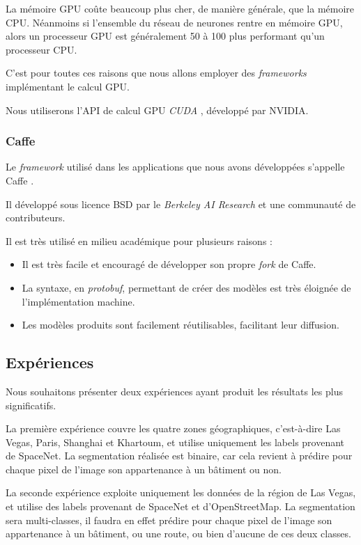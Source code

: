 \documentclass[a4paper, 11pt]{report}
\begin{document}
La mémoire GPU coûte beaucoup plus cher, de manière générale, que la mémoire CPU. Néanmoins si l'ensemble du réseau de neurones rentre en mémoire GPU, alors un processeur GPU est généralement 50 à 100 plus performant qu'un processeur CPU.

C'est pour toutes ces raisons que nous allons employer des \emph{frameworks} implémentant le calcul GPU.

Nous utiliserons l'API de calcul GPU \emph{CUDA} \citep{NVIDIACorporation2010}, développé par NVIDIA.

\subsubsection{Caffe}
Le \emph{framework} utilisé dans les applications que nous avons développées s'appelle Caffe \citep{Jia2014}.

Il développé sous licence BSD par le \emph{Berkeley AI Research} et une communauté de contributeurs.

Il est très utilisé en milieu académique pour plusieurs raisons :
\begin{itemize}
	\item Il est très facile et encouragé de développer son propre \emph{fork} de Caffe.
	\item La syntaxe, en \emph{protobuf}, permettant de créer des modèles est très éloignée de l'implémentation machine.
	\item Les modèles produits sont facilement réutilisables, facilitant leur diffusion.
\end{itemize}
\subsection{Expériences}
Nous souhaitons présenter deux expériences ayant produit les résultats les plus significatifs.

La première expérience couvre les quatre zones géographiques, c'est-à-dire Las Vegas, Paris, Shanghai et Khartoum, et utilise uniquement les labels provenant de SpaceNet.
La segmentation réalisée est binaire, car cela revient à prédire pour chaque pixel de l'image son appartenance à un bâtiment ou non.

La seconde expérience exploite uniquement les données de la région de Las Vegas,  et utilise des labels provenant de SpaceNet et d'OpenStreetMap.
La segmentation sera multi-classes, il faudra en effet prédire pour chaque pixel de l'image son appartenance à un bâtiment, ou une route, ou bien d'aucune de ces deux classes.
\end{document}
